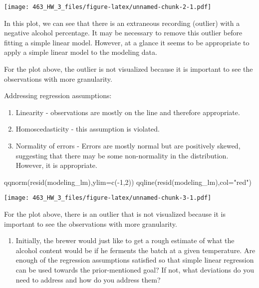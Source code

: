 \documentclass[
]{article}
\newenvironment{Shaded}{\begin{snugshade}}{\end{snugshade}}
\newcommand{\AttributeTok}[1]{\textcolor[rgb]{0.77,0.63,0.00}{#1}}
\newcommand{\DecValTok}[1]{\textcolor[rgb]{0.00,0.00,0.81}{#1}}
\newcommand{\FunctionTok}[1]{\textcolor[rgb]{0.00,0.00,0.00}{#1}}
\newcommand{\NormalTok}[1]{#1}
\newcommand{\SpecialCharTok}[1]{\textcolor[rgb]{0.00,0.00,0.00}{#1}}
\newcommand{\StringTok}[1]{\textcolor[rgb]{0.31,0.60,0.02}{#1}}
\providecommand{\tightlist}{%
  \setlength{\itemsep}{0pt}\setlength{\parskip}{0pt}}
\begin{document}
\texttt{[image: 463\_HW\_3\_files/figure-latex/unnamed-chunk-2-1.pdf]}

In this plot, we can see that there is an extraneous recording (outlier)
with a negative alcohol percentage. It may be necessary to remove this
outlier before fitting a simple linear model. However, at a glance it
seems to be appropriate to apply a simple linear model to the modeling
data.

For the plot above, the outlier is not visualized because it is
important to see the observations with more granularity.

Addressing regression assumptions:

\begin{enumerate}
\def\labelenumi{\arabic{enumi}.}
\item
  Linearity - observations are mostly on the line and therefore
  appropriate.
\item
  Homoscedasticity - this assumption is violated.
\item
  Normality of errors - Errors are mostly normal but are positively
  skewed, suggesting that there may be some non-normality in the
  distribution. However, it is appropriate.
\end{enumerate}

\begin{Shaded}
\begin{Highlighting}[]
\FunctionTok{qqnorm}\NormalTok{(}\FunctionTok{resid}\NormalTok{(modeling\_lm),}\AttributeTok{ylim=}\FunctionTok{c}\NormalTok{(}\SpecialCharTok{{-}}\DecValTok{1}\NormalTok{,}\DecValTok{2}\NormalTok{))}
\FunctionTok{qqline}\NormalTok{(}\FunctionTok{resid}\NormalTok{(modeling\_lm),}\AttributeTok{col=}\StringTok{"red"}\NormalTok{)}
\end{Highlighting}
\end{Shaded}

\texttt{[image: 463\_HW\_3\_files/figure-latex/unnamed-chunk-3-1.pdf]}

For the plot above, there is an outlier that is not visualized because
it is important to see the observations with more granularity.

\begin{enumerate}
\def\labelenumi{\arabic{enumi})}
\setcounter{enumi}{1}
\tightlist
\item
  Initially, the brewer would just like to get a rough estimate of what
  the alcohol content would be if he ferments the batch at a given
  temperature. Are enough of the regression assumptions satisfied so
  that simple linear regression can be used towards the prior-mentioned
  goal? If not, what deviations do you need to address and how do you
  address them?
\end{enumerate}
\end{document}
